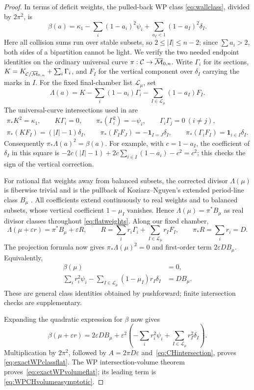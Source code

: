 \begin{proof}
In terms of deficit weights, the pulled-back WP class
\eqref{eq:wallclass}, divided by $2\pi^2$, is
\[
 \beta(a)=\kappa_1-\sum_i(1-a_i)^2\psi_i+
           \sum_{a_I<1}(1-a_I)^2\delta_I.
\]
Here all collision sums run over stable subsets, so
$2\le |I|\le n-2$; since $\sum a_i>2$, both sides of a
bipartition cannot be light. We verify the two needed endpoint
identities on the ordinary universal curve
$\pi:\mathcal C\to\overline{\mathcal M}_{0,n}$. Write $\Gamma_i$ for its sections,
$K=K_{\mathcal C/\overline{\mathcal M}_{0,n}}+\sum_i\Gamma_i$, and $F_I$ for
the vertical component over $\delta_I$ carrying the marks in $I$.
For the fixed final-chamber list $\mathcal L_\mu$, set
\[
 \Lambda(a)=K-\sum_i(1-a_i)\Gamma_i
                  -\sum_{I\in\mathcal L_\mu}(1-a_I)F_I.
\]
The universal-curve intersections used in
\cite[Section 8.4]{KoziarzNguyen} are
\[
 \begin{gathered}
 \pi_*K^2=\kappa_1,\qquad K\Gamma_i=0,\qquad
 \pi_*(\Gamma_i^2)=-\psi_i,\qquad \Gamma_i\Gamma_j=0\ (i\ne j),\\
 \pi_*(KF_I)=(|I|-1)\delta_I,\qquad
 \pi_*(F_IF_J)=-\mathbf1_{I=J}\delta_I,\qquad
 \pi_*(\Gamma_iF_I)=\mathbf1_{i\in I}\delta_I.
 \end{gathered}
\]
Consequently $\pi_*\Lambda(a)^2=\beta(a)$. For example, with
$c=1-a_I$, the coefficient of $\delta_I$ in this square is
$-2c(|I|-1)+2c\sum_{i\in I}(1-a_i)-c^2=c^2$; this checks
the sign of the vertical correction.

For rational flat weights away from balanced subsets, the corrected
divisor $\Lambda(\mu)$ is fiberwise trivial and is the pullback of
Koziarz--Nguyen's extended period-line class $B_\mu$
\cite[Sections 8.1 and 8.4]{KoziarzNguyen}. All coefficients extend
continuously to real weights and to balanced subsets, whose vertical
coefficient $1-\mu_I$ vanishes. Hence
$\Lambda(\mu)=\pi^*B_\mu$ as real divisor classes throughout
\eqref{eq:flatweights}. Along our fixed chamber,
\[
 \Lambda(\mu+\varepsilon r)=\pi^*B_\mu+\varepsilon R,
 \qquad R=\sum_i r_i\Gamma_i+\sum_{I\in\mathcal L_\mu}r_IF_I,
 \qquad \pi_*R=\sum_i r_i=D.
\]
The projection formula now gives
$\pi_*\Lambda(\mu)^2=0$ and first-order term
$2\varepsilon D B_\mu$. Equivalently,
\begin{align*}
 \beta(\mu)&=0,\\
 \sum_i r_i^2\psi_i-
   \sum_{I\in\mathcal L_\mu}(1-\mu_I)r_I\delta_I&=D B_\mu.
\end{align*}
These are general class identities obtained by pushforward; finite
intersection checks are supplementary.

Expanding the quadratic expression for $\beta$ now gives
\[
 \beta(\mu+\varepsilon r)=2\varepsilon D B_\mu+
 \varepsilon^2\left(-\sum_i r_i^2\psi_i+
                \sum_{I\in\mathcal L_\mu}r_I^2\delta_I\right).
\]
Multiplication by $2\pi^2$, followed by
$A=2\pi D\varepsilon$ and~\eqref{eq:CHintersection}, proves
\eqref{eq:exactWPclassflat}. The WP intersection-volume theorem
\cite{AMN} proves~\eqref{eq:exactWPvolumeflat}; its leading term is
\eqref{eq:WPCHvolumeasymptotic}.
\end{proof}

